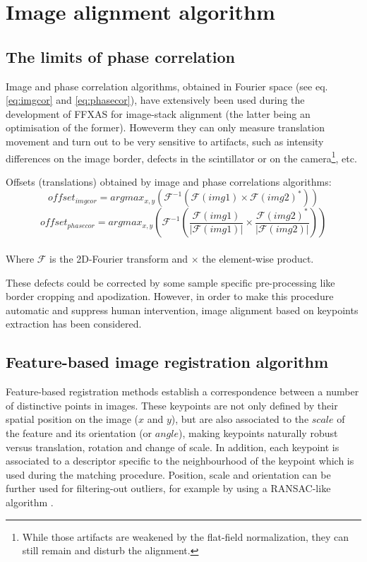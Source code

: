 \documentclass[preprint]{iucr}
\begin{document}
\section{Image alignment algorithm}

\subsection{The limits of phase correlation}

Image and phase correlation algorithms, obtained in Fourier space (see eq.
\ref{eq:imgcor} and \ref{eq:phasecor}), have
extensively been used during the development of FFXAS for image-stack alignment
(the latter being an optimisation of the former). Howeverm they can only
measure translation movement and turn out to be very sensitive to
artifacts, such as intensity differences on the image border, defects in the
scintillator or on the camera\footnote{While those artifacts are weakened by
the flat-field normalization, they can still remain and disturb the alignment.},
etc.

\begin{center}
Offsets (translations) obtained by image and phase correlations algorithms:
\begin{equation}
\label{eq:imgcor}
offset_{img cor} =
argmax_{x,y}\mathopen{}\left (
\mathcal{F}^{-1}(\mathcal{F}(img1)\times\mathcal{F}(img2)^*)\mathclose{}\right )
\end{equation}
\begin{equation}
\label{eq:phasecor}
offset_{phase cor} =
argmax_{x,y}\mathopen{}\left (\mathcal{F}^{-1}(\frac{\mathcal{F}(img1)}{|\mathcal{F}(img1)|}
\times\frac{\mathcal{F}(img2)^*}{|\mathcal{F}(img2)|})\mathclose{}\right )
\end{equation}
\\Where $\mathcal{F}$ is the 2D-Fourier transform and $\times$ the element-wise
product.
\end{center}

These defects could be corrected by some sample
specific pre-processing like border cropping and apodization.
However, in order to make this procedure automatic and suppress human
intervention, image alignment based on keypoints extraction has been
considered.

\subsection{Feature-based image registration algorithm}

Feature-based registration methods establish a correspondence between a
number of distinctive points in images.
These keypoints are not only defined by their spatial position on the image
($x$ and $y$), but are also associated to the $scale$ of the feature and its
orientation (or $angle$),
making keypoints naturally robust versus
translation, rotation and change of scale.
In addition, each keypoint is associated to a descriptor specific to the
neighbourhood of the keypoint which is used during the matching procedure.
Position, scale and orientation can be further used for filtering-out outliers,
for example by using a RANSAC-like algorithm \cite{orsa}.
\end{document}
